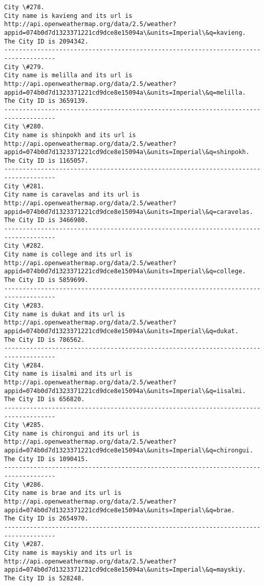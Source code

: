 \documentclass[11pt]{article}
\begin{document}
\begin{Verbatim}[commandchars=\\\{\}]
City \#278.
City name is kavieng and its url is http://api.openweathermap.org/data/2.5/weather?appid=074b0d7d1323371221cd9dce8e15094a\&units=Imperial\&q=kavieng.
The City ID is 2094342.
------------------------------------------------------------------------------------
City \#279.
City name is melilla and its url is http://api.openweathermap.org/data/2.5/weather?appid=074b0d7d1323371221cd9dce8e15094a\&units=Imperial\&q=melilla.
The City ID is 3659139.
------------------------------------------------------------------------------------
City \#280.
City name is shinpokh and its url is http://api.openweathermap.org/data/2.5/weather?appid=074b0d7d1323371221cd9dce8e15094a\&units=Imperial\&q=shinpokh.
The City ID is 1165057.
------------------------------------------------------------------------------------
City \#281.
City name is caravelas and its url is http://api.openweathermap.org/data/2.5/weather?appid=074b0d7d1323371221cd9dce8e15094a\&units=Imperial\&q=caravelas.
The City ID is 3466980.
------------------------------------------------------------------------------------
City \#282.
City name is college and its url is http://api.openweathermap.org/data/2.5/weather?appid=074b0d7d1323371221cd9dce8e15094a\&units=Imperial\&q=college.
The City ID is 5859699.
------------------------------------------------------------------------------------
City \#283.
City name is dukat and its url is http://api.openweathermap.org/data/2.5/weather?appid=074b0d7d1323371221cd9dce8e15094a\&units=Imperial\&q=dukat.
The City ID is 786562.
------------------------------------------------------------------------------------
City \#284.
City name is iisalmi and its url is http://api.openweathermap.org/data/2.5/weather?appid=074b0d7d1323371221cd9dce8e15094a\&units=Imperial\&q=iisalmi.
The City ID is 656820.
------------------------------------------------------------------------------------
City \#285.
City name is chirongui and its url is http://api.openweathermap.org/data/2.5/weather?appid=074b0d7d1323371221cd9dce8e15094a\&units=Imperial\&q=chirongui.
The City ID is 1090415.
------------------------------------------------------------------------------------
City \#286.
City name is brae and its url is http://api.openweathermap.org/data/2.5/weather?appid=074b0d7d1323371221cd9dce8e15094a\&units=Imperial\&q=brae.
The City ID is 2654970.
------------------------------------------------------------------------------------
City \#287.
City name is mayskiy and its url is http://api.openweathermap.org/data/2.5/weather?appid=074b0d7d1323371221cd9dce8e15094a\&units=Imperial\&q=mayskiy.
The City ID is 528248.

\end{Verbatim}
\end{document}
